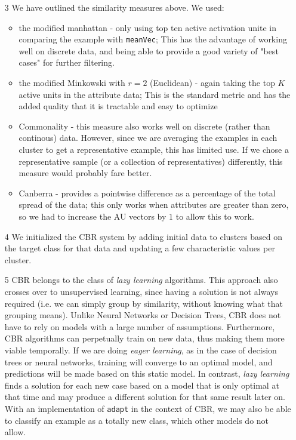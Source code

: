 \documentclass[a4paper,12pt,oneside,final]{report}
\begin{document}
\begin{itemize}
\item[3]  We have outlined the similarity measures above.  We used:
\begin{itemize}
\item the modified manhattan - only using top ten active activation unite in comparing the example with \verb+meanVec+; This has the advantage of working well on discrete data, and being able to provide a good variety of "best cases" for further filtering.
\item the modified Minkowski with $r = 2$ (Euclidean) - again taking the top $K$ active units in the attribute data; This is the standard metric and has the added quality that it is tractable and easy to optimize
\item Commonality - this measure also works well on discrete (rather than continous) data.  However, since we are averaging the examples in each cluster to get a representative example, this has limited use.  If we chose a representative sample (or a collection of representatives) differently, this measure would probably fare better.
\item Canberra - provides a pointwise difference as a percentage of the total spread of the data;  this only works when attributes are greater than zero, so we had to increase the AU vectors by $1$ to allow this to work.
\end{itemize}
\item[4]  We initialized the CBR system by adding initial data to clusters based on the target class for that data and updating a few characteristic values per cluster.  
\item[5] CBR belongs to the class of \emph{lazy learning} algorithms.  This approach also crosses over to unsupervised learning, since having a solution is not always required (i.e. we can simply group by similarity, without knowing what that grouping means).  Unlike Neural Networks or Decision Trees, CBR does not have to rely on models with a large number of assumptions.  Furthermore, CBR algorithms can perpetually train on new data, thus making them more viable temporally.  If we are doing \emph{eager learning}, as in the case of decision trees or neural networks, training will converge to an optimal model, and predictions will be made based on this static model.  In contrast, \emph{lazy learning} finds a solution for each new case based on a model that is only optimal at that time and may produce a different solution for that same result later on.  With an implementation of \verb+adapt+ in the context of CBR, we may also be able to classify an example as a totally new class, which other models do not allow.
\end{itemize}
\end{document}
